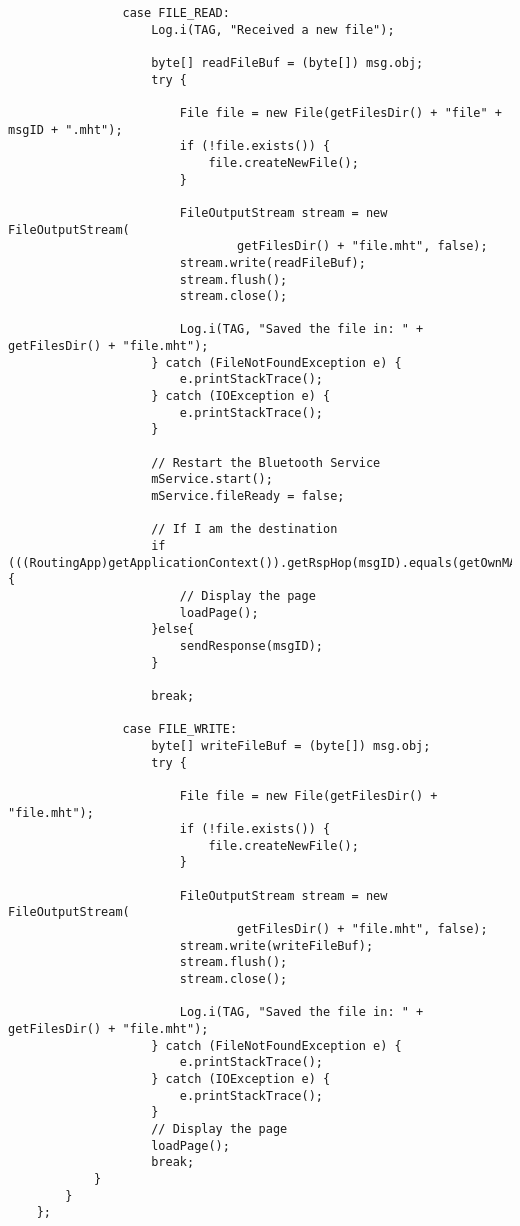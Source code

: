 \begin{verbatim}
                case FILE_READ:
                    Log.i(TAG, "Received a new file");

                    byte[] readFileBuf = (byte[]) msg.obj;
                    try {

                        File file = new File(getFilesDir() + "file" + msgID + ".mht");
                        if (!file.exists()) {
                            file.createNewFile();
                        }

                        FileOutputStream stream = new FileOutputStream(
                                getFilesDir() + "file.mht", false);
                        stream.write(readFileBuf);
                        stream.flush();
                        stream.close();

                        Log.i(TAG, "Saved the file in: " + getFilesDir() + "file.mht");
                    } catch (FileNotFoundException e) {
                        e.printStackTrace();
                    } catch (IOException e) {
                        e.printStackTrace();
                    }

                    // Restart the Bluetooth Service
                    mService.start();
                    mService.fileReady = false;

                    // If I am the destination
                    if (((RoutingApp)getApplicationContext()).getRspHop(msgID).equals(getOwnMAC())) {
                        // Display the page
                        loadPage();
                    }else{
                        sendResponse(msgID);
                    }

                    break;

                case FILE_WRITE:
                    byte[] writeFileBuf = (byte[]) msg.obj;
                    try {

                        File file = new File(getFilesDir() + "file.mht");
                        if (!file.exists()) {
                            file.createNewFile();
                        }

                        FileOutputStream stream = new FileOutputStream(
                                getFilesDir() + "file.mht", false);
                        stream.write(writeFileBuf);
                        stream.flush();
                        stream.close();

                        Log.i(TAG, "Saved the file in: " + getFilesDir() + "file.mht");
                    } catch (FileNotFoundException e) {
                        e.printStackTrace();
                    } catch (IOException e) {
                        e.printStackTrace();
                    }
                    // Display the page
                    loadPage();
                    break;
            }
        }
    };


\end{verbatim}
